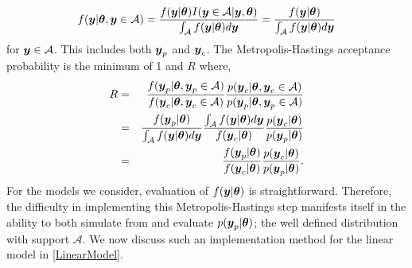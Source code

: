 \documentclass[ba]{imsart}
\def\bth{\mbox{\boldmath $\theta$}}
\newcommand{\by}{\mbox{\boldmath $y$}}
\newcommand{\red}[1]{{\color{red}#1}}
\newcommand{\green}[1]{{\color{green}#1}}
\begin{document}
\begin{eqnarray*}
f(\by | \bth, \by \in \mathcal{A}) =  \frac{f(\by | \bth) I(\by \in \mathcal{A} | \by, \bth)}{\int_\mathcal{A} f(\by | \bth) d\by} 
      = \frac{f(\by | \bth)}{\int_\mathcal{A} f(\by | \bth) d\by} 
\end{eqnarray*}
for $\by \in \mathcal{A}$.  This includes both $\by_p$ and $\by_c$.  The Metropolis-Hastings acceptance probability  is the minimum of 1 and $R$ where,
\begin{eqnarray}
\label{MHRatio}
R & = & \frac{f(\by_p|\bth,\by_p \in \mathcal{A})}{f(\by_c|\bth,\by_c \in \mathcal{A})}  
                \frac{p(\by_c|\bth, \by_c \in \mathcal{A})}{p(\by_p|\bth,\by_p \in \mathcal{A})} \\
  & = & \frac{f(\by_p | \bth)}{\int_\mathcal{A} f(\by | \bth) d\by} \frac{\int_\mathcal{A} f(\by | \bth) d\by}{f(\by_c | \bth)} \frac{p(\by_c | \bth)}{p(\by_p | \bth)} \\
 & = & \frac{f(\by_p|\bth)}{f(\by_c|\bth)} \frac{p(\by_c|\bth)}{p(\by_p|\bth)} .  
\end{eqnarray}
For the models we consider, evaluation of $f(\by | \bth)$ is straightforward.  Therefore, the difficulty in implementing this Metropolis-Hastings step manifests  itself in the ability to both simulate from and evaluate $p(\by_p | \bth)$; the well defined distribution with support $\mathcal{A}$. We now discuss such an implementation method for the linear model in \eqref{LinearModel}.
\end{document}
